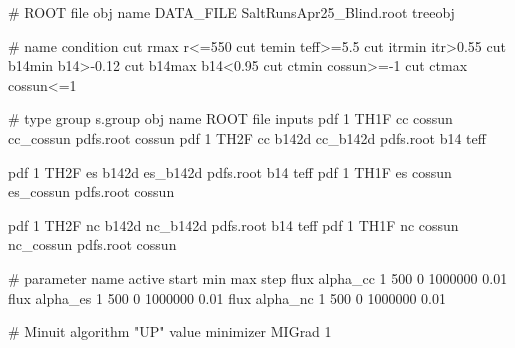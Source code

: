 \begin{boxedverbatim}
#               ROOT file                obj name 
DATA_FILE       SaltRunsApr25_Blind.root  treeobj

#       name    condition   
cut     rmax    r<=550
cut     temin   teff>=5.5
cut     itrmin  itr>0.55
cut     b14min  b14>-0.12
cut     b14max  b14<0.95
cut     ctmin   cossun>=-1
cut     ctmax   cossun<=1

#     type  group  s.group  obj name  ROOT file   inputs 
pdf 1  TH1F   cc       cossun  cc_cossun pdfs.root  cossun
pdf 1  TH2F   cc       b142d   cc_b142d  pdfs.root  b14  teff

pdf 1  TH2F   es       b142d   es_b142d  pdfs.root  b14  teff
pdf 1  TH1F   es       cossun  es_cossun pdfs.root  cossun

pdf 1  TH2F   nc       b142d   nc_b142d  pdfs.root  b14  teff
pdf 1  TH1F   nc       cossun  nc_cossun pdfs.root  cossun

#     parameter name  active  start  min   max    step
flux    alpha_cc        1      500    0  1000000  0.01
flux    alpha_es        1      500    0  1000000  0.01
flux    alpha_nc        1      500    0  1000000  0.01

#         Minuit algorithm  "UP" value 
minimizer      MIGrad           1
\end{boxedverbatim}

